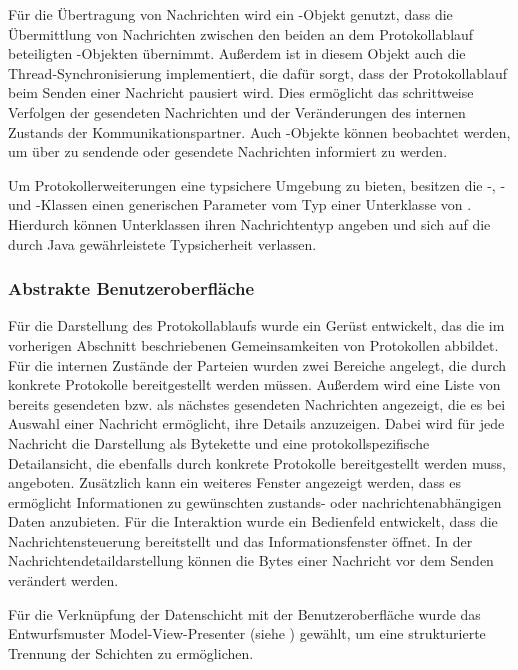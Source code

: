 Für die Übertragung von Nachrichten wird ein -Objekt genutzt, dass die Übermittlung von Nachrichten zwischen den beiden an dem Protokollablauf beteiligten -Objekten übernimmt. Außerdem ist in diesem Objekt auch die Thread-Synchronisierung implementiert, die dafür sorgt, dass der Protokollablauf beim Senden einer Nachricht pausiert wird. Dies ermöglicht das schrittweise Verfolgen der gesendeten Nachrichten und der Veränderungen des internen Zustands der Kommunikationspartner. Auch -Objekte können beobachtet werden, um über zu sendende oder gesendete Nachrichten informiert zu werden.

Um Protokollerweiterungen eine typsichere Umgebung zu bieten, besitzen die \nobreakdash-, - und -Klassen einen generischen Parameter vom Typ einer Unterklasse von . Hierdurch können Unterklassen ihren Nachrichtentyp angeben und sich auf die durch Java gewährleistete Typsicherheit verlassen.

\subsubsection{Abstrakte Benutzeroberfläche}
Für die Darstellung des Protokollablaufs wurde ein Gerüst entwickelt, das die im vorherigen Abschnitt beschriebenen Gemeinsamkeiten von Protokollen abbildet. Für die internen Zustände der Parteien wurden zwei Bereiche angelegt, die durch konkrete Protokolle bereitgestellt werden müssen. Außerdem wird eine Liste von bereits gesendeten bzw. als nächstes gesendeten Nachrichten angezeigt, die es  bei Auswahl einer Nachricht ermöglicht, ihre Details anzuzeigen. Dabei wird für jede Nachricht die Darstellung als Bytekette und eine protokollspezifische Detailansicht, die ebenfalls durch konkrete Protokolle bereitgestellt werden muss, angeboten. Zusätzlich kann ein weiteres Fenster angezeigt werden, dass es ermöglicht Informationen zu gewünschten zustands- oder nachrichtenabhängigen Daten anzubieten. Für die Interaktion wurde ein Bedienfeld entwickelt, dass die Nachrichtensteuerung bereitstellt und das Informationsfenster öffnet. In der Nachrichtendetaildarstellung können die Bytes einer Nachricht vor dem Senden verändert werden.

Für die Verknüpfung der Datenschicht mit der Benutzeroberfläche wurde das Entwurfsmuster Model-View-Presenter (siehe \cite{potel96}) gewählt, um eine strukturierte Trennung der Schichten zu ermöglichen.

